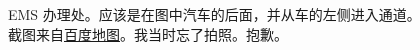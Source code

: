 \documentclass[final]{book}
\begin{document}
\begin{appendices}
\begin{figure}
  \caption[EMS 办理处]{EMS 办理处。应该是在图中汽车的后面，并从车的左侧进入通道。截图来自\href{https://map.baidu.com/\#panoid=09002200121707010635276742I\&panotype=street\&heading=274.99\&pitch=-2.29\&l=12\&tn=B_NORMAL_MAP\&sc=0\&newmap=1\&shareurl=1\&pid=09002200121707010635276742I}{百度地图}。我当时忘了拍照。抱歉。}
  \label{fig:EMS}
\end{figure}




















 

\end{appendices}
\end{document}
